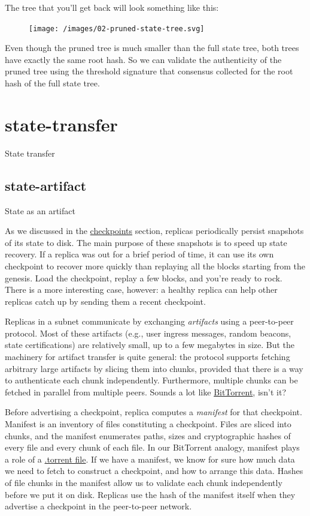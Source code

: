 \documentclass{article}
\begin{document}
The tree that you'll get back will look something like this:

\begin{figure}[grayscale-diagram]
\texttt{[image: /images/02-pruned-state-tree.svg]}
\end{figure}

Even though the pruned tree is much smaller than the full state tree, both trees have exactly the same root hash.
So we can validate the authenticity of the pruned tree using the threshold signature that consensus collected for the root hash of the full state tree.

\section{state-transfer}{State transfer}

\subsection{state-artifact}{State as an artifact}

As we discussed in the \href{#checkpoints}{checkpoints} section, replicas periodically persist snapshots of its state to disk.
The main purpose of these snapshots is to speed up state recovery.
If a replica was out for a brief period of time, it can use its own checkpoint to recover more quickly than replaying all the blocks starting from the genesis.
Load the checkpoint, replay a few blocks, and you're ready to rock.
There is a more interesting case, however: a healthy replica can help other replicas catch up by sending them a recent checkpoint.

Replicas in a subnet communicate by exchanging \emph{artifacts} using a peer-to-peer protocol.
Most of these artifacts (e.g., user ingress messages, random beacons, state certifications) are relatively small, up to a few megabytes in size.
But the machinery for artifact transfer is quite general: the protocol supports fetching arbitrary large artifacts by slicing them into chunks, provided that there is a way to authenticate each chunk independently.
Furthermore, multiple chunks can be fetched in parallel from multiple peers.
Sounds a lot like \href{https://en.wikipedia.org/wiki/BitTorrent}{BitTorrent}, isn't it?

Before advertising a checkpoint, replica computes a \emph{manifest} for that checkpoint.
Manifest is an inventory of files constituting a checkpoint.
Files are sliced into chunks, and the manifest enumerates paths, sizes and cryptographic hashes of every file and every chunk of each file.
In our BitTorrent analogy, manifest plays a role of a \href{https://en.wikipedia.org/wiki/Torrent_file}{.torrent file}.
If we have a manifest, we know for sure how much data we need to fetch to construct a checkpoint, and how to arrange this data.
Hashes of file chunks in the manifest allow us to validate each chunk independently before we put it on disk.
Replicas use the hash of the manifest itself when they advertise a checkpoint in the peer-to-peer network.
\end{document}
